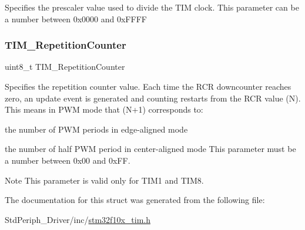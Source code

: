 Specifies the prescaler value used to divide the T\+IM clock. This parameter can be a number between 0x0000 and 0x\+F\+F\+FF \mbox{\label{struct_t_i_m___time_base_init_type_def_a121b27ced71ccb2c85f1d9825ae8d496}} 
\subsubsection{\texorpdfstring{TIM\_RepetitionCounter}{TIM\_RepetitionCounter}}
{\footnotesize\ttfamily uint8\+\_\+t T\+I\+M\+\_\+\+Repetition\+Counter}

Specifies the repetition counter value. Each time the R\+CR downcounter reaches zero, an update event is generated and counting restarts from the R\+CR value (N). This means in P\+WM mode that (N+1) corresponds to\+:
\begin{DoxyItemize}
\item the number of P\+WM periods in edge-\/aligned mode
\item the number of half P\+WM period in center-\/aligned mode This parameter must be a number between 0x00 and 0x\+FF. \begin{DoxyNote}{Note}
This parameter is valid only for T\+I\+M1 and T\+I\+M8. 
\end{DoxyNote}

\end{DoxyItemize}

The documentation for this struct was generated from the following file\+:\begin{DoxyCompactItemize}
\item 
Std\+Periph\+\_\+\+Driver/inc/\mbox{\hyperlink{stm32f10x__tim_8h}{stm32f10x\+\_\+tim.\+h}}\end{DoxyCompactItemize}
